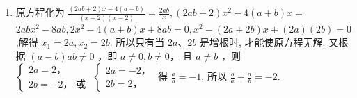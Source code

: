 \documentclass[10pt]{article}
\begin{document}
\begin{enumerate}
  \item 原方程化为 $\frac{(2 a b+2) x-4(a+b)}{(x+2)(x-2)}=\frac{2 a b}{x},(2 a b+2) x^{2}-4(a+b) x=$ $2 a b x^{2}-8 a b, 2 x^{2}-4(a+b) x+8 a b=0, x^{2}-(2 a+2 b) x+(2 a)(2 b)=0$,解得 $x_{1}=2 a, x_{2}=2 b$. 所以只有当 $2 a 、 2 b$ 是增根时, 才能使原方程无解. 又根据 $(a-b) a b \neq 0$ ，即 $a \neq 0, b \neq 0 ，$ 且 $a \neq b$ ，则 $\left\{\begin{array}{l}2 a=2 ， \\ 2 b=-2 ， \text { 或 }\end{array}\left\{\begin{array}{l}2 a=-2 ， \\ 2 b=2 ，\end{array}\right.\right.$ 得 $\frac{a}{b}=-1$, 所以 $\frac{b}{a}+\frac{a}{b}=-2$.
\end{enumerate}
\end{document}

